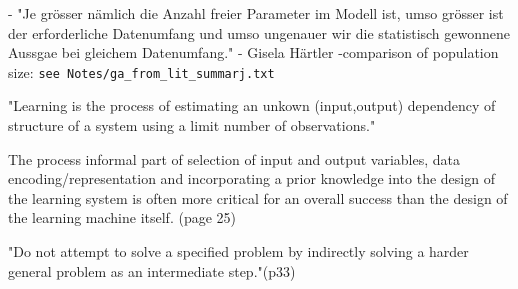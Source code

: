 - "Je grösser nämlich die Anzahl freier Parameter im Modell ist, umso grösser ist der erforderliche Datenumfang und umso ungenauer wir die statistisch gewonnene Aussgae bei gleichem Datenumfang." - Gisela Härtler\cite{haertler2014statistisch}
-comparison of population size: 
\verb|see Notes/ga_from_lit_summarj.txt|



"Learning is the process of estimating an unkown (input,output) dependency of structure of a system using a limit number of observations."\cite{cherkassky1998learning}

The process informal part of selection of input and output variables, data encoding/representation and incorporating a prior knowledge into the design of the learning system is often more critical for an overall success than the design of the learning machine itself.\cite{cherkassky1998learning} (page 25)

"Do not attempt to solve a specified problem by indirectly solving a harder general problem as an intermediate step."\cite{cherkassky1998learning}(p33)


